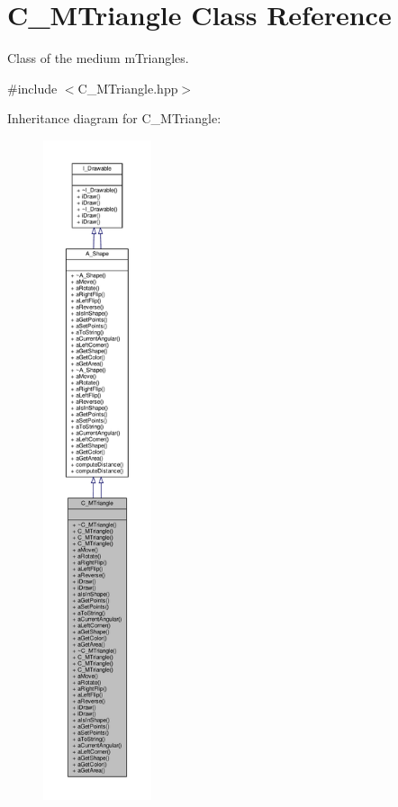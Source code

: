 \hypertarget{classC__MTriangle}{}\section{C\+\_\+\+M\+Triangle Class Reference}
\label{classC__MTriangle}


Class of the medium m\+Triangles.  




{\ttfamily \#include $<$C\+\_\+\+M\+Triangle.\+hpp$>$}



Inheritance diagram for C\+\_\+\+M\+Triangle\+:\nopagebreak
\begin{figure}[H]
\begin{center}
\leavevmode
\includegraphics[height=550pt]{classC__MTriangle__inherit__graph}
\end{center}
\end{figure}


